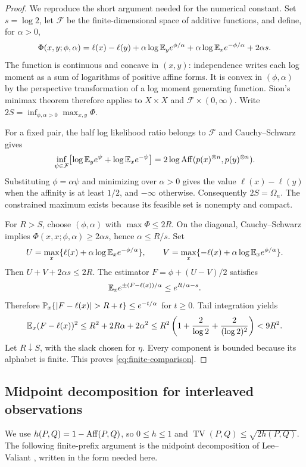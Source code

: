 \begin{proof}
We reproduce the short argument needed for the numerical constant. Set
$s=\log2$, let $\mathcal F$ be the finite-dimensional space of additive
functions, and define, for $\alpha>0$,
\[
 \Phi(x,y;\phi,\alpha)=\ell(x)-\ell(y)
 +\alpha\log\mathbb E_y e^{\phi/\alpha}
 +\alpha\log\mathbb E_x e^{-\phi/\alpha}+2\alpha s.
\]
The function is continuous and concave in $(x,y)$: independence writes each
log moment as a sum of logarithms of positive affine forms. It is convex in
$(\phi,\alpha)$ by the perspective transformation of a log moment generating
function. Sion's minimax theorem \cite{sion} therefore applies to $X\times X$ and
$\mathcal F\times(0,\infty)$. Write
$2S=\inf_{\phi,\alpha>0}\max_{x,y}\Phi$.

For a fixed pair, the half log likelihood ratio belongs to $\mathcal F$ and
Cauchy--Schwarz gives
\[
 \inf_{\psi\in\mathcal F}
 \bigl[\log\mathbb E_y e^\psi+\log\mathbb E_x e^{-\psi}\bigr]
 =2\log\operatorname{Aff}(p(x)^{\otimes n},p(y)^{\otimes n}).
\]
Substituting $\phi=\alpha\psi$ and minimizing over $\alpha>0$ gives the value
$\ell(x)-\ell(y)$ when the affinity is at least $1/2$, and $-\infty$ otherwise.
Consequently $2S=\Omega_n$. The constrained maximum exists because its feasible
set is nonempty and compact.

For $R>S$, choose $(\phi,\alpha)$ with $\max\Phi\le2R$. On the diagonal,
Cauchy--Schwarz implies $\Phi(x,x;\phi,\alpha)\ge2\alpha s$, hence
$\alpha\le R/s$. Set
\[
 U=\max_x\{\ell(x)+\alpha\log\mathbb E_xe^{-\phi/\alpha}\},\qquad
 V=\max_x\{-\ell(x)+\alpha\log\mathbb E_xe^{\phi/\alpha}\}.
\]
Then $U+V+2\alpha s\le2R$. The estimator
$F=\phi+(U-V)/2$ satisfies
\[
 \mathbb E_xe^{\pm(F-\ell(x))/\alpha}\le e^{R/\alpha-s}.
\]
Therefore $\Pp_x\{|F-\ell(x)|>R+t\}\le e^{-t/\alpha}$ for $t\ge0$.
Tail integration yields
\[
 \mathbb E_x(F-\ell(x))^2
 \le R^2+2R\alpha+2\alpha^2
 \le R^2\left(1+\frac2{\log2}+\frac2{(\log2)^2}\right)<9R^2.
\]
Let $R\downarrow S$, with the slack chosen for $\eta$. Every component is
bounded because its alphabet is finite. This proves
\eqref{eq:finite-comparison}.
\end{proof}


\subsection{Midpoint decomposition for interleaved observations}

We use $h(P,Q)=1-\operatorname{Aff}(P,Q)$, so $0\le h\le1$ and
$\operatorname{TV}(P,Q)\le\sqrt{2h(P,Q)}$.
The following finite-prefix argument is the midpoint decomposition of
Lee--Valiant \cite[Lemmas 17--18]{lv}, written in the form needed here.

